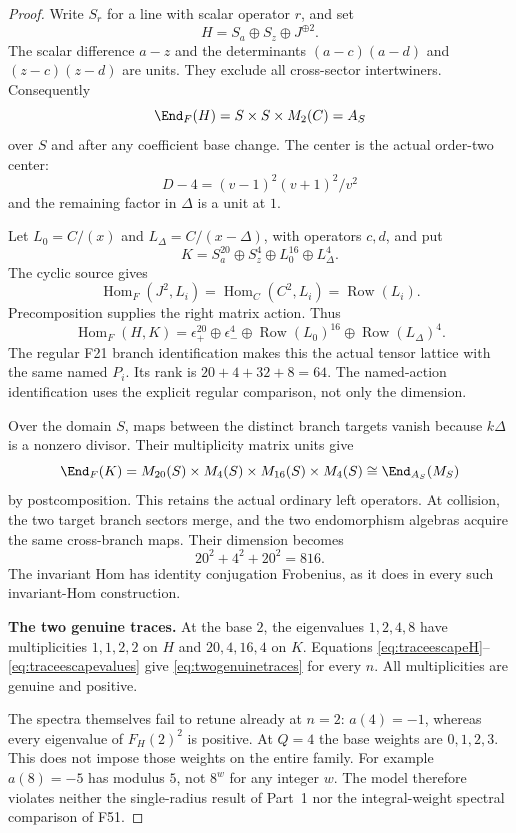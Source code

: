 \documentclass[11pt,a4paper]{article}
\newcommand{\fid}[1]{\textsf{#1}}\newcommand{\gate}[1]{\textsf{#1}}
\theoremstyle{named}\newtheorem{finding}{Finding}[section]
\theoremstyle{definition}\newtheorem{definition}[finding]{Definition}
\theoremstyle{remark}\newtheorem{remark}[finding]{Remark}
\begin{document}
\begin{proof}
Write $S_r$ for a line with scalar operator $r$, and set
\[
 H=S_a\oplus S_z\oplus J^{\oplus2}.
\]
The scalar difference $a-z$ and the determinants
$(a-c)(a-d)$ and $(z-c)(z-d)$ are units.
They exclude all cross-sector intertwiners.
Consequently
\begin{equation}\label{eq:traceescapefullcentralizer}
 \End_F(H)=S\times S\times M_2(C)=A_S
\end{equation}
over $S$ and after any coefficient base change.
The center is the actual order-two center:
\[
 D-4=(v-1)^2(v+1)^2/v^2
\]
and the remaining factor in $\Delta$ is a unit at $1$.

Let $L_0=C/(x)$ and $L_\Delta=C/(x-\Delta)$, with
operators $c,d$, and put
\[
 K=S_a^{20}\oplus S_z^4\oplus L_0^{16}\oplus L_\Delta^4.
\]
The cyclic source gives
\[
 \operatorname{Hom}_F(J^2,L_i)
       =\operatorname{Hom}_C(C^2,L_i)
       =\operatorname{Row}(L_i).
\]
Precomposition supplies the right matrix action.
Thus
\[
 \operatorname{Hom}_F(H,K)=
 \epsilon_+^{20}\oplus\epsilon_-^4
 \oplus\operatorname{Row}(L_0)^{16}
 \oplus\operatorname{Row}(L_\Delta)^4.
\]
The regular \fid{F21} branch identification makes this
the actual tensor lattice with the same named $P_i$.
Its rank is $20+4+32+8=64$.
The named-action identification uses the explicit regular
comparison, not only the dimension.

Over the domain $S$, maps between the distinct branch
targets vanish because $k\Delta$ is a nonzero divisor.
Their multiplicity matrix units give
\[
 \End_F(K)=M_{20}(S)\times M_4(S)\times
          M_{16}(S)\times M_4(S)
          \cong\End_{A_S}(M_S)
\]
by postcomposition.
This retains the actual ordinary left operators.
At collision, the two target branch sectors merge,
and the two endomorphism algebras acquire the same
cross-branch maps. Their dimension becomes
\[
 20^2+4^2+20^2=816.
\]
The invariant Hom has identity conjugation Frobenius,
as it does in every such invariant-Hom construction.

\par\smallskip\noindent\textbf{The two genuine traces.}\quad
At the base $2$, the eigenvalues $1,2,4,8$ have
multiplicities $1,1,2,2$ on $H$ and $20,4,16,4$ on $K$.
Equations \eqref{eq:traceescapeH}--\eqref{eq:traceescapevalues}
give \eqref{eq:twogenuinetraces} for every $n$.
All multiplicities are genuine and positive.

The spectra themselves fail to retune already at $n=2$:
$a(4)=-1$, whereas every eigenvalue of $F_H(2)^2$ is
positive.
At $Q=4$ the base weights are $0,1,2,3$.
This does not impose those weights on the entire family.
For example $a(8)=-5$ has modulus $5$, not $8^w$ for
any integer $w$.
The model therefore violates neither the single-radius
result of Part~1 nor the integral-weight spectral
comparison of \fid{F51}.
\end{proof}
\end{document}

